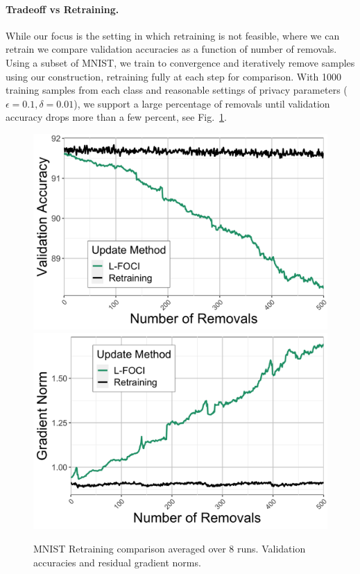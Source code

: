 
\paragraph{Tradeoff vs Retraining.}
While our focus is the setting in which retraining is not feasible, where we can retrain we compare validation accuracies as a function of number of removals. Using a subset of MNIST, we train to convergence and iteratively remove samples using our construction, retraining fully at each step for comparison. With 1000 training samples from each class 
and reasonable settings of privacy parameters ($\epsilon=0.1,\delta=0.01$),
we support a large percentage of removals until validation accuracy drops more than a few percent, see Fig.~\ref{fig:retrain}.
\begin{figure}
    \centering
\includegraphics[width=0.49\columnwidth]{5_unlearn/figs/retrain/Retrain_Validation_Accs.png}
\includegraphics[width=0.49\columnwidth]{5_unlearn/figs/retrain/Retrain_Gradient_Norms.png}
    \caption{MNIST Retraining comparison averaged over 8 runs. Validation accuracies and residual gradient norms.}
    \label{fig:retrain}
\end{figure}

